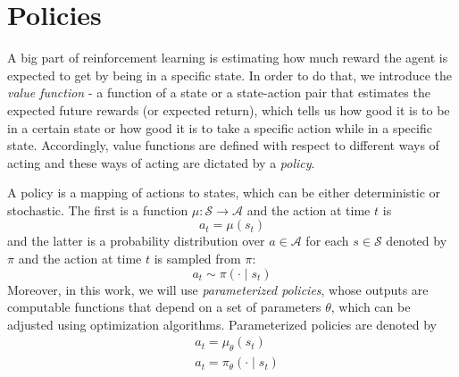 \section{Policies}
A big part of reinforcement learning is estimating how much reward the agent is expected to get by being in a specific state. In order to do that, we introduce the \textit{value function} - a function of a state or a state-action pair that estimates the expected future rewards (or expected return), which tells us how good it is to be in a certain state or how good it is to take a specific action while in a specific state. Accordingly, value functions are defined with respect to different ways of acting and these ways of acting are dictated by a \textit{policy}. 

A policy is a mapping of actions to states, which can be either deterministic or stochastic. The first is a function $\mu \colon \mathcal{S} \to \mathcal{A}$ and the action at time $t$ is
\[
      a_t = \mu(s_t)      
\]
and the latter is a probability distribution over $a \in \mathcal{A}$ for each $s \in \mathcal{S}$ denoted by $\pi$ and the action at time $t$ is sampled from $\pi$:
\[
      a_t \sim \pi(\cdot \mid s_t)      
\]
Moreover, in this work, we will use \textit{parameterized policies}, whose outputs are computable functions that depend on a set of parameters $\theta$, which can be adjusted using optimization algorithms. Parameterized policies are denoted by
\begin{align*}
      &a_t = \mu_\theta(s_t)\\
      &a_t = \pi_\theta(\cdot \mid s_t)\\
\end{align*}

